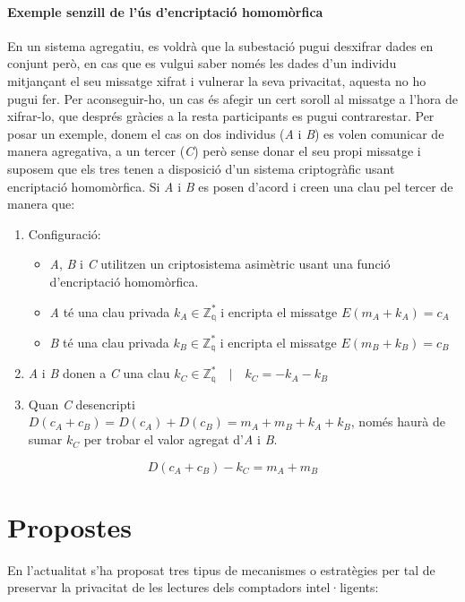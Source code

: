 \documentclass{article}
\begin{document}
\subsection{Exemple senzill de l'ús d'encriptació homomòrfica}\label{subsec:homomorfism-exemple}
En un sistema agregatiu, es voldrà que la subestació pugui desxifrar dades en conjunt però, en cas que es vulgui saber només les dades d'un individu mitjançant el seu missatge xifrat i vulnerar la seva privacitat, aquesta no ho pugui fer. Per aconseguir-ho, un cas és afegir un cert soroll al missatge a l'hora de xifrar-lo, que després gràcies a la resta participants es pugui contrarestar. Per posar un exemple, donem el cas on dos individus (\textit{A} i \textit{B}) es volen comunicar de manera agregativa, a un tercer (\textit{C}) però sense donar el seu propi missatge i suposem que els tres tenen a disposició d'un sistema criptogràfic usant encriptació homomòrfica. Si \textit{A} i \textit{B} es posen d'acord i creen una clau pel tercer de manera que:
\begin{enumerate}
	\item Configuració:
	\begin{itemize}
		\item \textit{A}, \textit{B} i \textit{C} utilitzen un criptosistema asimètric usant una funció d'encriptació homomòrfica.
		\item \textit{A} té una clau privada $k_A \in \mathbb{Z_q^*}$ i encripta el missatge $E(m_A + k_A) = c_A$
		\item \textit{B} té una clau privada $k_B \in \mathbb{Z_q^*}$  i encripta el missatge $E(m_B + k_B) = c_B$
	\end{itemize}
	\item \textit{A} i \textit{B} donen a \textit{C} una clau $k_C \in \mathbb{Z_q^*} \quad | \quad k_C = - k_A - k_B$
	\item Quan \textit{C} desencripti $D(c_A + c_B) = D(c_A) + D(c_B) = m_A + m_B + k_A + k_B$, només haurà de sumar $k_C$ per trobar el valor agregat d'\textit{A} i \textit{B}.
\end{enumerate}
\[D(c_A + c_B) - k_C = m_A + m_B\]
\newpage\part{Propostes}\label{part:propostes}
En l'actualitat s'ha proposat tres tipus de mecanismes o estratègies per tal de preservar la privacitat de les lectures dels comptadors intel·ligents:
\end{document}
